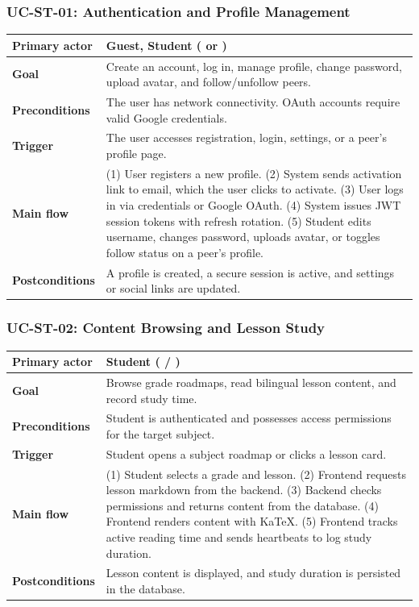 \subsubsection{UC-ST-01: Authentication and Profile Management}
\begin{longtable}{L{0.28\textwidth}L{0.62\textwidth}}
\textbf{Primary actor} & Guest, Student ( or ) \\ \hline
\textbf{Goal} & Create an account, log in, manage profile, change password, upload avatar, and follow/unfollow peers. \\ \hline
\textbf{Preconditions} & The user has network connectivity. OAuth accounts require valid Google credentials. \\ \hline
\textbf{Trigger} & The user accesses registration, login, settings, or a peer's profile page. \\ \hline
\textbf{Main flow} & (1) User registers a new profile. (2) System sends activation link to email, which the user clicks to activate. (3) User logs in via credentials or Google OAuth. (4) System issues JWT session tokens with refresh rotation. (5) Student edits username, changes password, uploads avatar, or toggles follow status on a peer's profile. \\ \hline
\textbf{Postconditions} & A profile is created, a secure session is active, and settings or social links are updated. \\
\end{longtable}

\subsubsection{UC-ST-02: Content Browsing and Lesson Study}
\begin{longtable}{L{0.28\textwidth}L{0.62\textwidth}}
\textbf{Primary actor} & Student ( / ) \\ \hline
\textbf{Goal} & Browse grade roadmaps, read bilingual lesson content, and record study time. \\ \hline
\textbf{Preconditions} & Student is authenticated and possesses access permissions for the target subject. \\ \hline
\textbf{Trigger} & Student opens a subject roadmap or clicks a lesson card. \\ \hline
\textbf{Main flow} & (1) Student selects a grade and lesson. (2) Frontend requests lesson markdown from the backend. (3) Backend checks permissions and returns content from the database. (4) Frontend renders content with KaTeX. (5) Frontend tracks active reading time and sends heartbeats to log study duration. \\ \hline
\textbf{Postconditions} & Lesson content is displayed, and study duration is persisted in the database. \\
\end{longtable}

